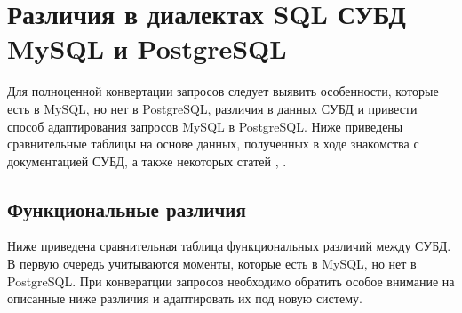 \chapter{Различия в диалектах SQL СУБД MySQL и PostgreSQL}
\label{cha:classification}
Для полноценной конвертации запросов следует выявить особенности, которые есть в MySQL, но нет в PostgreSQL,
различия в данных СУБД и привести способ адаптирования запросов MySQL в PostgreSQL.
Ниже приведены сравнительные таблицы на основе данных, полученных в ходе знакомства с документацией СУБД, а также 
некоторых статей \cite{rdbms-standard-diff}, \cite{cmp-postgresql-mysql}.
\section{Функциональные различия}
Ниже приведена сравнительная таблица функциональных различий между СУБД.  
В первую очередь учитываются моменты, которые есть в MySQL, но нет в PostgreSQL. При конвератции запросов необходимо обратить особое внимание
на описанные ниже различия и адаптировать их под новую систему.
\clearpage
